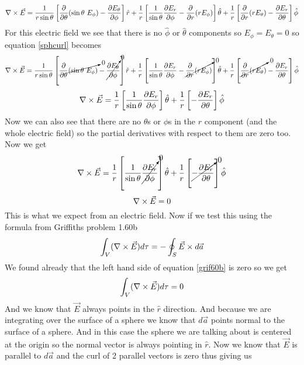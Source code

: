 \documentclass[11pt]{article}
\numberwithin{equation}{section}
\newcommand{\grad}{\bold\nabla}
\newcommand{\vecE}{\vec{E}}
\begin{document}
\begin{enumerate}[(a)]
\begin{equation}
\grad\times\vecE = \frac{1}{r\sin\theta}\left[\frac{\partial}{\partial\theta}(\sin\theta \ E_{\phi}) - \frac{\partial E_{\theta}}{\partial\phi}\right]\hat{r} + \frac{1}{r}\left[\frac{1}{\sin\theta}\frac{\partial E_{r}}{\partial\phi}  - \frac{\partial}{\partial r}(r E_{\phi})\right]\hat{\theta} +\frac{1}{r}\left[\frac{\partial}{\partial r}(r E_{\theta}) - \frac{\partial E_{r}}{\partial\theta}\right]\hat{\phi}
\label{sphcurl}
\end{equation}
For this electric field we see that there is no $\hat{\phi}$ or $\hat{\theta}$ components so $E_{\phi} = E_{\theta} = 0$ so equation \ref{sphcurl} becomes
$$\grad\times\vecE = \frac{1}{r\sin\theta}\left[\cancelto{0}{\frac{\partial}{\partial\theta}(\sin\theta \ E_{\phi})} - \cancelto{0}{\frac{\partial E_{\theta}}{\partial\phi}}\right]\hat{r} + \frac{1}{r}\left[\frac{1}{\sin\theta}\frac{\partial E_{r}}{\partial\phi}  - \cancelto{0}{\frac{\partial}{\partial r}(r E_{\phi})}\right]\hat{\theta} +\frac{1}{r}\left[\cancelto{0}{\frac{\partial}{\partial r}(r E_{\theta})} - \frac{\partial E_{r}}{\partial\theta}\right]\hat{\phi}$$
$$\grad\times\vecE = \frac{1}{r}\left[\frac{1}{\sin\theta}\frac{\partial E_{r}}{\partial\phi}\right]\hat{\theta} +\frac{1}{r}\left[-\frac{\partial E_{r}}{\partial\theta}\right]\hat{\phi}$$
Now we can also see that there are no $\theta$s or $\phi$s in the $r$ component (and the whole electric field) so the partial derivatives with respect to them are zero too. Now we get 
$$\grad\times\vecE = \frac{1}{r}\left[\frac{1}{\sin\theta}\cancelto{0}{\frac{\partial E_{r}}{\partial\phi}}\right]\hat{\theta} +\frac{1}{r}\left[\cancelto{0}{-\frac{\partial E_{r}}{\partial\theta}}\right]\hat{\phi}$$
$$\grad\times\vecE = 0$$
This is what we expect from an electric field.
Now if we test this using the formula from Griffiths problem 1.60b 
\begin{equation}
\int_V(\grad\times\vecE)d\tau = -\oint_S\vecE\times d\vec{a}
\label{grif60b}
\end{equation}
We found already that the left hand side of equation \ref{grif60b} is zero so we get 
$$\int_V(\grad\times\vecE)d\tau = 0$$
And we know that $\vecE$ always points in the $\hat{r}$ direction. And because we are integrating over the surface of a sphere we know that $d\vec{a}$ points normal to the surface of a sphere. And in this case the sphere we are talking about is centered at the origin so the normal vector is always pointing in $\hat{r}$. Now we know that $\vecE$ is parallel to $d\vec{a}$ and the curl of 2 parallel vectors is zero thus giving us


\end{enumerate}
\end{document}
